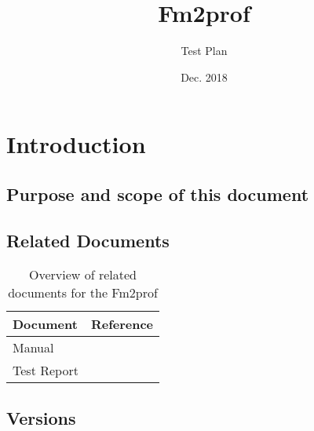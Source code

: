 \documentclass[signature]{deltares_report}
\begin{document}
\pagestyle{empty}
\cleardoublepage
%

\newcommand{\ProgramName}{Fm2prof\xspace}

\title{\ProgramName}
\subtitle{Test Plan}
\classification{-}

\date{Dec. 2018}



\summary{}

\revieweri{}
\approvali{}

\disclaimer{}

\deltarestitle


\chapter{Introduction} 
\label{chapterIntroduction}

\section{Purpose and scope of this document} \label{sec:PurposeAndScope}

\section{Related Documents}
\label{sec:RelatedDocuments}
\bigskip
\begin{longtable}{|p{}|p{}|}
\caption{Overview of related documents for the \ProgramName \label{tab:RelatedDocuments}}\\	\hline
		\hline 
		\textbf{Document} & \textbf{Reference} \\
		\hline 
		\hline 
		Manual & \citep{Fm2prof_Manual2018} \\
		Test Report & \citep{Fm2prof_TestReport2018}  \\
    \hline			
\end{longtable}

\section{Versions}
\label{sec:Versions}
\end{document}
